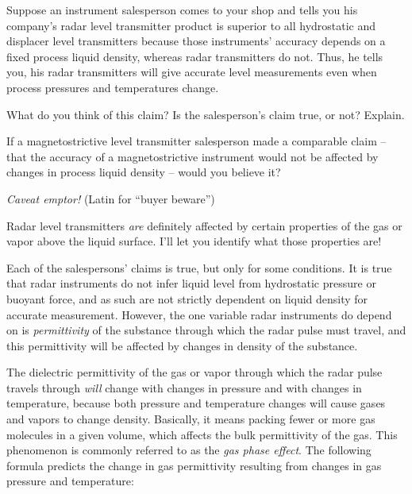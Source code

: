 

Suppose an instrument salesperson comes to your shop and tells you his company's radar level transmitter product is superior to all hydrostatic and displacer level transmitters because those instruments' accuracy depends on a fixed process liquid density, whereas radar transmitters do not.  Thus, he tells you, his radar transmitters will give accurate level measurements even when process pressures and temperatures change.

What do you think of this claim?  Is the salesperson's claim true, or not?  Explain.

\vskip 10pt

If a magnetostrictive level transmitter salesperson made a comparable claim -- that the accuracy of a magnetostrictive instrument would not be affected by changes in process liquid density -- would you believe it?







{\it Caveat emptor!} (Latin for ``buyer beware'')

\vskip 10pt

Radar level transmitters {\it are} definitely affected by certain properties of the gas or vapor above the liquid surface.  I'll let you identify what those properties are!







Each of the salespersons' claims is true, but only for some conditions.  It is true that radar instruments do not infer liquid level from hydrostatic pressure or buoyant force, and as such are not strictly dependent on liquid density for accurate measurement.  However, the one variable radar instruments do depend on is {\it permittivity} of the substance through which the radar pulse must travel, and this permittivity will be affected by changes in density of the substance.

The dielectric permittivity of the gas or vapor through which the radar pulse travels through {\it will} change with changes in pressure and with changes in temperature, because both pressure and temperature changes will cause gases and vapors to change density.  Basically, it means packing fewer or more gas molecules in a given volume, which affects the bulk permittivity of the gas.  This phenomenon is commonly referred to as the {\it gas phase effect}.  The following formula predicts the change in gas permittivity resulting from changes in gas pressure and temperature:

